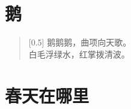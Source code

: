 \documentclass[12pt,UTF-8,openany]{ctexbook}
\begin{document}
\chapter{鹅}

\begin{large}
    
    \begin{verse}[0.5\linewidth]
        \phantom{鹅}鹅鹅鹅\phantom{鹅}，曲项向天歌。 \\
        白毛浮绿水，红掌拨清波。
    \end{verse}
    
\end{large}


\clearpage

\begin{center}
    
\end{center}


\hanzibox{}\hanzibox{}\hanzibox{}\hanzibox{}\hspace{1em}\hanzibox{}\hanzibox{}\hanzibox{}\hanzibox{}

\hanzibox{}\hanzibox{}\hanzibox{}\hanzibox{}\hspace{1em}\hanzibox{}\hanzibox{}\hanzibox{}\hanzibox{}

\hanzibox{}\hanzibox{}\hanzibox{}\hanzibox{}\hspace{1em}\hanzibox{}\hanzibox{}\hanzibox{}\hanzibox{}

\hanzibox{}\hanzibox{}\hanzibox{}\hanzibox{}\hspace{1em}




\chapter{春天在哪里}
\end{document}
